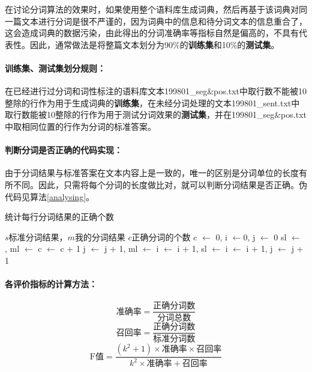 \documentclass[11pt,a4paper]{article}
\begin{document}
	在讨论分词算法的效果时，如果使用整个语料库生成词典，然后再基于该词典对同一篇文本进行分词是很不严谨的，因为词典中的信息和待分词文本的信息重合了，这会造成词典的数据污染，由此得出的分词准确率等指标自然是偏高的，不具有代表性。因此，通常做法是将整篇文本划分为90\%的\textbf{训练集}和10\%的\textbf{测试集}。
	
	\paragraph{训练集、测试集划分规则：}在已经进行过分词和词性标注的语料库文本199801\_seg\&pos.txt中取行数不能被10整除的行作为用于生成词典的\textbf{训练集}，在未经分词处理的文本199801\_sent.txt中取行数能被10整除的行作为用于测试分词效果的\textbf{测试集}，并在199801\_seg\&pos.txt中取相同位置的行作为分词的标准答案。
	
	\paragraph{判断分词是否正确的代码实现：}由于分词结果与标准答案在文本内容上是一致的，唯一的区别是分词单位的长度有所不同。因此，只需将每个分词的长度做比对，就可以判断分词结果是否正确。伪代码见算法\ref{analysing}。
	
	\begin{algorithm}[ht]
		\caption{统计每行分词结果的正确个数}\label{analysing}
		\begin{algorithmic}[1] %
			\Require $s$标准分词结果，$m$我的分词结果
			\Ensure $c$正确分词的个数
			\State c $\gets$ 0, i $\gets$0, j $\gets$ 0
			\State sl $\gets$ , ml $\gets$ 
			\State c $\gets$ c + 1
			\Else
			\State j $\gets$ j + 1, ml $\gets$ 
			\Else
			\State i $\gets$ i + 1, sl $\gets$ 
			\EndIf
			\EndWhile
			\EndIf
			\State i $\gets$ i + 1, j $\gets$ j + 1
			\EndWhile
			\EndFunction  
		\end{algorithmic}  
	\end{algorithm}
	
	\paragraph{各评价指标的计算方法：}
	\begin{equation}
		\mbox{准确率}=\frac{\mbox{正确分词数}}{\mbox{分词总数}}\label{precision}
	\end{equation}
	\begin{equation}
		\mbox{召回率}=\frac{\mbox{正确分词数}}{\mbox{标准分词数}}\label{recall}
	\end{equation}
	\begin{equation}
		\mbox{F值}=\frac{(k^2+1)\times \mbox{准确率}\times \mbox{召回率}}{k^2\times \mbox{准确率}+\mbox{召回率}}\label{fvalue}
	\end{equation}
	
\end{document}
